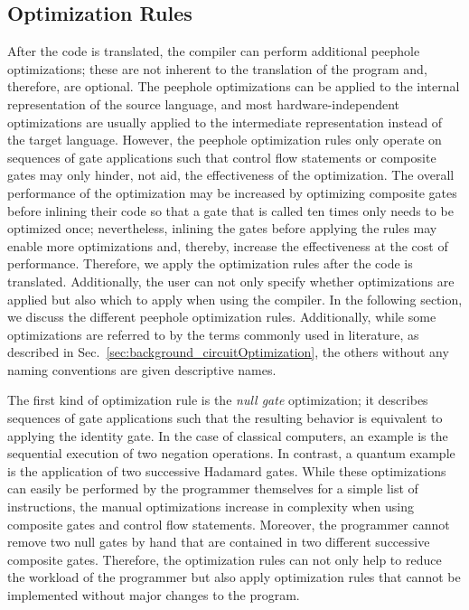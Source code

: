 \subsection{Optimization Rules}
\label{sec:concept_optimizationRules}
After the code is translated, the compiler can perform additional peephole optimizations; these are not inherent to the translation of the program and, therefore, are optional. 
The peephole optimizations can be applied to the internal representation of the source language, and most hardware-independent optimizations are usually applied to the intermediate representation instead of the target language. However, the peephole optimization rules only operate on sequences of gate applications such that control flow statements or composite gates may only hinder, not aid, the effectiveness of the optimization. The overall performance of the optimization may be increased by optimizing composite gates before inlining their code so that a gate that is called ten times only needs to be optimized once; nevertheless, inlining the gates before applying the rules may enable more optimizations and, thereby, increase the effectiveness at the cost of performance. Therefore, we apply the optimization rules after the code is translated.
Additionally, the user can not only specify whether optimizations are applied but also which to apply when using the compiler. In the following section, we discuss the different peephole optimization rules. 
Additionally, while some optimizations are referred to by the terms commonly used in literature, as described in Sec.~\ref{sec:background_circuitOptimization}, the others without any naming conventions are given descriptive names.

The first kind of optimization rule is the \emph{null gate} optimization; it describes sequences of gate applications such that the resulting behavior is equivalent to applying the identity gate. In the case of classical computers, an example is the sequential execution of two negation operations. In contrast, a quantum example is the application of two successive Hadamard gates. While these optimizations can easily be performed by the programmer themselves for a simple list of instructions, the manual optimizations increase in complexity when using composite gates and control flow statements. Moreover, the programmer cannot remove two null gates by hand that are contained in two different successive composite gates. Therefore, the optimization rules can not only help to reduce the workload of the programmer but also apply optimization rules that cannot be implemented without major changes to the program.

